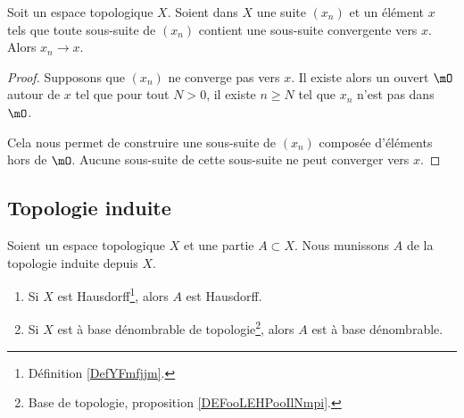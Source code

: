 \begin{lemma}        \label{LEMooSJKMooKSiEGq}
	Soit un espace topologique \( X\). Soient dans \( X\) une suite \( (x_n)\) et un élément \( x\) tels que toute sous-suite de \( (x_n)\) contient une sous-suite convergente vers \( x\). Alors \( x_n\to x\).
\end{lemma}

\begin{proof}
	Supposons que \( (x_n)\) ne converge pas vers \( x\). Il existe alors un ouvert \( \mO\) autour de \( x\) tel que pour tout \( N>0\), il existe \( n\geq N\) tel que \( x_n\) n'est pas dans \( \mO\).

	Cela nous permet de construire une sous-suite de \( (x_n)\) composée d'éléments hors de \( \mO\). Aucune sous-suite de cette sous-suite ne peut converger vers \( x\).
\end{proof}


\subsection{Topologie induite}


\begin{proposition}	\label{PROPooAHIMooYhOwUf}
	Soient un espace topologique \( X\) et une partie \( A\subset X\). Nous munissons \( A\) de la topologie induite depuis \( X\).
	\begin{enumerate}
		\item		\label{ITEMooLXGWooYgPqoT}
		      Si \( X\) est Hausdorff\footnote{Définition \ref{DefYFmfjjm}.}, alors \( A\) est Hausdorff.
		\item		\label{ITEMooOQZDooGztljW}
		      Si \( X\) est à base dénombrable de topologie\footnote{Base de topologie, proposition \ref{DEFooLEHPooIlNmpi}.}, alors \( A\) est à base dénombrable.
	\end{enumerate}
\end{proposition}

